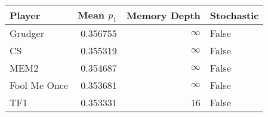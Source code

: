 \begin{tabular}{lrrl}
\toprule
       Player &  Mean $p_1$ &  Memory Depth & Stochastic \\
\midrule
      Grudger &    0.356755 &            \(\infty\) &      False \\
           CS &    0.355319 &            \(\infty\) &      False \\
         MEM2 &    0.354687 &            \(\infty\) &      False \\
 Fool Me Once &    0.353681 &            \(\infty\) &      False \\
          TF1 &    0.353331 &            16 &      False \\
\bottomrule
\end{tabular}

